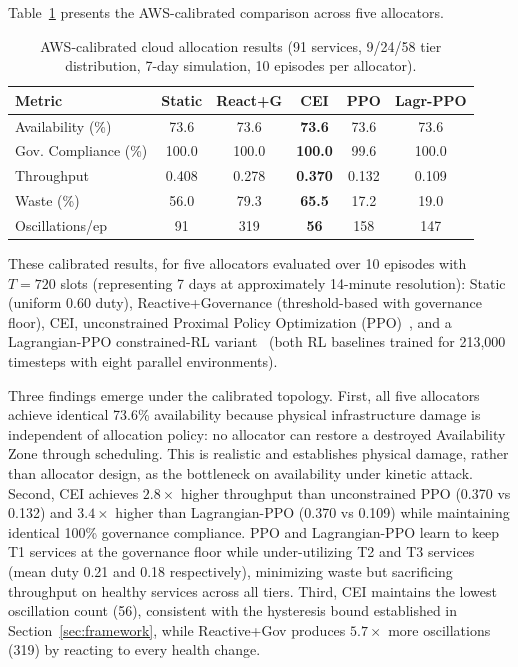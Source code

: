 \documentclass[runningheads]{llncs}
\begin{document}
Table~\ref{tab:aws_cal} presents the AWS-calibrated comparison across five allocators.

\begin{table}[ht]
\caption{AWS-calibrated cloud allocation results (91 services, 9/24/58 tier distribution, 7-day simulation, 10 episodes per allocator).}
\label{tab:aws_cal}
\centering
\small
\begin{tabular}{lccccc}
\toprule
Metric & Static & React+G & \textbf{CEI} & PPO & Lagr-PPO \\
\midrule
Availability (\%)     & 73.6  & 73.6  & \textbf{73.6}  & 73.6  & 73.6  \\
Gov. Compliance (\%)  & 100.0 & 100.0 & \textbf{100.0} & 99.6  & 100.0 \\
Throughput            & 0.408 & 0.278 & \textbf{0.370} & 0.132 & 0.109 \\
Waste (\%)            & 56.0  & 79.3  & \textbf{65.5}  & 17.2  & 19.0  \\
Oscillations/ep       & 91    & 319   & \textbf{56}    & 158   & 147   \\
\bottomrule
\end{tabular}
\end{table}

These calibrated results, for five allocators evaluated over 10 episodes with $T = 720$ slots (representing 7 days at approximately 14-minute resolution): Static (uniform 0.60 duty), Reactive+Governance (threshold-based with governance floor), CEI, unconstrained Proximal Policy Optimization (PPO)~\cite{schulman}, and a Lagrangian-PPO constrained-RL variant~\cite{achiam} (both RL baselines trained for 213{,}000 timesteps with eight parallel environments).

Three findings emerge under the calibrated topology. First, all five allocators achieve identical 73.6\% availability because physical infrastructure damage is independent of allocation policy: no allocator can restore a destroyed Availability Zone through scheduling. This is realistic and establishes physical damage, rather than allocator design, as the bottleneck on availability under kinetic attack. Second, CEI achieves $2.8\times$ higher throughput than unconstrained PPO (0.370 vs 0.132) and $3.4\times$ higher than Lagrangian-PPO (0.370 vs 0.109) while maintaining identical 100\% governance compliance. PPO and Lagrangian-PPO learn to keep T1 services at the governance floor while under-utilizing T2 and T3 services (mean duty 0.21 and 0.18 respectively), minimizing waste but sacrificing throughput on healthy services across all tiers. Third, CEI maintains the lowest oscillation count (56), consistent with the hysteresis bound established in Section~\ref{sec:framework}, while Reactive+Gov produces $5.7\times$ more oscillations (319) by reacting to every health change.
\end{document}
